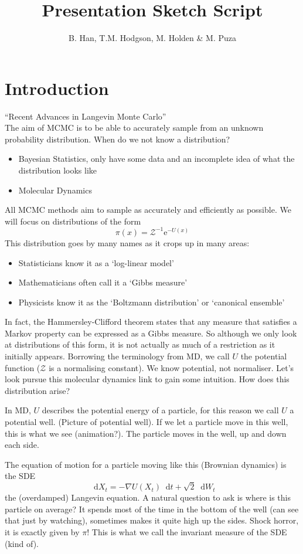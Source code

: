\documentclass[a4paper]{article}
\title{Presentation Sketch Script}
\author{B. Han, T.M. Hodgson, M. Holden \& M. Puza}
\newcommand{\dif}{\mathop{}\!\mathrm{d}}
\newcommand{\e}{\mathrm{e}}
\newcommand{\grad}{\nabla}
\begin{document}
\maketitle
\section{Introduction}
``Recent Advances in Langevin Monte Carlo'' \\
The aim of MCMC is to be able to accurately sample from an unknown probability distribution. When do we not know a distribution?
 \begin{itemize}
     \item Bayesian Statistics, only have some data and an incomplete idea of what the distribution looks like
     \item Molecular Dynamics
 \end{itemize}
 All MCMC methods aim to sample as accurately and efficiently as possible. We will focus on distributions of the form 
 \[\pi(x) = \mathcal{Z}^{-1} \e^{-U(x)}\]
 This distribution goes by many names as it crops up in many areas:
 \begin{itemize}
     \item Statisticians know it as a `log-linear model'
     \item Mathematicians often call it a `Gibbs measure'
     \item Physicists know it as the `Boltzmann distribution' or `canonical ensemble'
 \end{itemize}
 In fact, the Hammersley-Clifford theorem states that any measure that satisfies a Markov property can be expressed as a Gibbs measure. So although we only look at distributions of this form, it is not actually as much of a restriction as it initially appears. Borrowing the terminology from MD, we call \(U\) the potential function (\(\mathcal{Z}\) is a normalising constant). We know potential, not normaliser. Let's look pursue this molecular dynamics link to gain some intuition. How does this distribution arise?
 
 In MD, \(U\) describes the potential energy of a particle, for this reason we call \(U\) a potential well. (Picture of potential well). If we let a particle move in this well, this is what we see (animation?). The particle moves in the well, up and down each side. 
 
 The equation of motion for a particle moving like this (Brownian dynamics) is the SDE
 \[\dif X_t = -\grad U(X_t) \dif t +\sqrt{2}\dif W_t\]
 the (overdamped) Langevin equation. A natural question to ask is where is this particle on average? It spends most of the time in the bottom of the well (can see that just by watching), sometimes makes it quite high up the sides. Shock horror, it is exactly given by \(\pi\)! This is what we call the invariant measure of the SDE (kind of).
\end{document}
